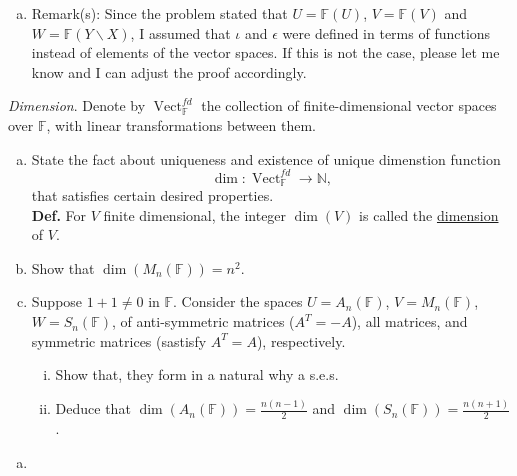 \documentclass{article}
\begin{document}
\begin{enumerate}[a)]
\begin{enumerate}[i)]
\begin{proof}
            for all $g \in V$ and $x \in W$. This map is surjective because for any $h \in W$, we can define a function $g \in V$ by
            \[
                g(x) = \begin{cases}
                    h(x) & \text{if } x \in W \\
                    0 & \text{if } x \notin W
                \end{cases}
            \]
            such that $\epsilon(g) = h$. Finally, we need to show that $\operatorname{im}(\iota) = \ker(\epsilon)$. If $f \in U$, then $\epsilon(\iota(f)) = 0$ since $\iota(f)$ is zero outside of $U$. Conversely, if $g \in V$ and $\epsilon(g) = 0$, then $g(x) = 0$ for all $x \in W$, which means that $g$ must be in the image of $\iota$. Therefore, we have shown that the sequence
            \[
                0 \xrightarrow{} U \xrightarrow{\iota} V \xrightarrow{\epsilon} W \xrightarrow{} 0
            \]
            is a short exact sequence.
        \end{proof}
    \end{enumerate}
    \item[] Remark(s): Since the problem stated that $U = \mathbb{F}(U)$, $V = \mathbb{F}(V)$ and $W = \mathbb{F}(Y \backslash X)$, I assumed that $\iota$ and $\epsilon$ were defined in terms of functions instead of elements of the vector spaces. If this is not the case, please let me know and I can adjust the proof accordingly.
\end{enumerate}


\begin{problem}
    \textit{Dimension}. Denote by $\operatorname{Vect}_{\mathbb{F}}^{fd}$ the collection of finite-dimensional vector spaces over $\mathbb{F}$, with linear transformations between them.
    \begin{enumerate}[a)]
        \item State the fact about uniqueness and existence of unique dimenstion function
        \[
            \dim: \operatorname{Vect}_{\mathbb{F}}^{fd} \to \mathbb{N},
        \]
        that satisfies certain desired properties. \\
        \textbf{Def.} For $V$ finite dimensional, the integer $\dim(V)$ is called the \underline{dimension} of $V$.
        \item Show that $\dim(M_n(\mathbb{F})) = n^2$.
        \item Suppose $1 + 1 \neq 0$ in $\mathbb{F}$. Consider the spaces $U = A_n(\mathbb{F})$, $V = M_n(\mathbb{F})$, $W = S_n(\mathbb{F})$, of anti-symmetric matrices ($A^T = -A$), all matrices, and symmetric matrices (sastisfy $A^T = A$), respectively. 
        \begin{enumerate}[i)]
            \item Show that, they form in a natural why a s.e.s.
            \item Deduce that $\dim(A_n(\mathbb{F})) = \frac{n(n-1)}{2}$ and $\dim(S_n(\mathbb{F})) = \frac{n(n+1)}{2}$.
        \end{enumerate}
    \end{enumerate}
\end{problem}

\begin{enumerate}[a)]
    \item 
\end{enumerate}
\end{document}

